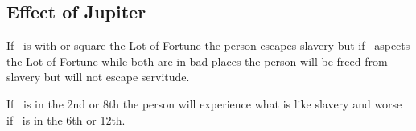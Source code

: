 \subsection{Effect of Jupiter}
If \Jupiter\, is with or square the Lot of Fortune the person escapes slavery but if \Jupiter\, aspects the Lot of Fortune while both are  in bad places the person will be freed from slavery but will not escape servitude.

If \Jupiter\, is in the 2nd or 8th the person will experience what is like slavery and worse if \Jupiter\, is in the 6th or 12th.






















